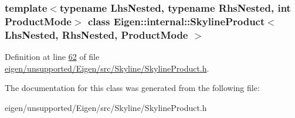 \subsubsection*{template$<$typename Lhs\+Nested, typename Rhs\+Nested, int Product\+Mode$>$\newline
class Eigen\+::internal\+::\+Skyline\+Product$<$ Lhs\+Nested, Rhs\+Nested, Product\+Mode $>$}



Definition at line \hyperlink{eigen_2unsupported_2_eigen_2src_2_skyline_2_skyline_product_8h_source_l00062}{62} of file \hyperlink{eigen_2unsupported_2_eigen_2src_2_skyline_2_skyline_product_8h_source}{eigen/unsupported/\+Eigen/src/\+Skyline/\+Skyline\+Product.\+h}.



The documentation for this class was generated from the following file\+:\begin{DoxyCompactItemize}
\item 
eigen/unsupported/\+Eigen/src/\+Skyline/\+Skyline\+Product.\+h\end{DoxyCompactItemize}
